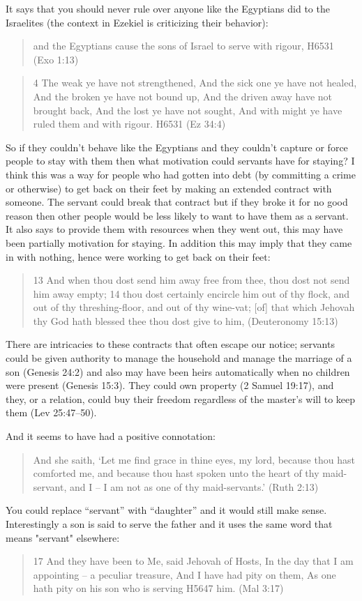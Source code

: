 \documentclass[11pt]{article}
\begin{document}
It says that you should never rule over anyone like the Egyptians did to the Israelites (the context in Ezekiel is criticizing their behavior):
 \begin{quote}
and the Egyptians cause the sons of Israel to serve with rigour, H6531 (Exo 1:13)
\end{quote}

\begin{quote}
4 The weak ye have not strengthened, And the sick one ye have not healed, And the broken ye have not bound up, And the driven away have not brought back, And the lost ye have not sought, And with might ye have ruled them and with rigour. H6531 (Ez 34:4)
\end{quote}

So if they couldn't behave like the Egyptians and they couldn't capture or force people to stay with them then what motivation could servants have for staying? I think this was a way for people who had gotten into debt (by committing a crime or otherwise) to get back on their feet by making an extended contract with someone. The servant could break that contract but if they broke it for no good reason then other people would be less likely to want to have them as a servant. It also says to provide them with resources when they went out, this may have been partially motivation for staying. In addition this may imply that they came in with nothing, hence were working to get back on their feet:
\begin{quote}
13 And when thou dost send him away free from thee, thou dost not send him away empty;
14 thou dost certainly encircle him out of thy flock, and out of thy threshing-floor, and out of thy wine-vat; [of] that which Jehovah thy God hath blessed thee thou dost give to him, (Deuteronomy 15:13)
\end{quote}

There are intricacies to these contracts that often escape our notice; servants could be given authority to manage the household and manage the marriage of a son (Genesis 24:2) and also may have been heirs automatically when no children were present (Genesis 15:3). They could own property (2 Samuel 19:17), and they, or a relation, could buy their freedom regardless of the master's will to keep them (Lev 25:47–50).

And it seems to have had a positive connotation:
\begin{quote}
And she saith, `Let me find grace in thine eyes, my lord, because thou hast comforted me, and because thou hast spoken unto the heart of thy maid-servant, and I -- I am not as one of thy maid-servants.' (Ruth 2:13)
\end{quote}
You could replace “servant” with “daughter” and it would still make sense. Interestingly a son is said to serve the father and it uses the same word that means "servant" elsewhere:
\begin{quote}
17 And they have been to Me, said Jehovah of Hosts, In the day that I am appointing -- a peculiar treasure, And I have had pity on them, As one hath pity on his son who is serving H5647 him. (Mal 3:17)
\end{quote}
\end{document}
